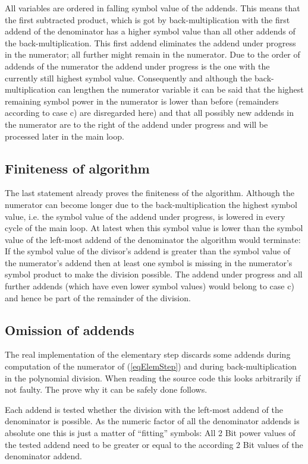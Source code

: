 All variables are ordered in falling symbol value of the addends. This
means that the first subtracted product, which is got by
back-multiplication with the first addend of the denominator has a higher
symbol value than all other addends of the back-multiplication. This first
addend eliminates the addend under progress in the numerator; all further
might remain in the numerator. Due to the order of addends of the
numerator the addend under progress is the one with the currently still
highest symbol value. Consequently and although the back-multiplication
can lengthen the numerator variable it can be said that the highest
remaining symbol power in the numerator is lower than before (remainders
according to case c) are disregarded here) and that all possibly new
addends in the numerator are to the right of the addend under progress and
will be processed later in the main loop.


\subsection{Finiteness of algorithm}

The last statement already proves the finiteness of the algorithm.
Although the numerator can become longer due to the back-multiplication
the highest symbol value, i.e. the symbol value of the addend under
progress, is lowered in every cycle of the main loop. At latest when this
symbol value is lower than the symbol value of the left-most addend of the
denominator the algorithm would terminate: If the symbol value of the
divisor's addend is greater than the symbol value of the numerator's
addend then at least one symbol is missing in the numerator's symbol
product to make the division possible. The addend under progress and all
further addends (which have even lower symbol values) would belong to case
c) and hence be part of the remainder of the division.


\subsection{Omission of addends}

The real implementation of the elementary step discards some addends during
computation of the numerator of (\ref{eqElemStep}) and during
back-multiplication in the polynomial division. When reading the source
code this looks arbitrarily if not faulty. The prove why it can be
safely done follows.

Each addend is tested whether the division with the left-most addend of the
denominator is possible. As the numeric factor of all the denominator
addends is absolute one this is just a matter of ``fitting'' symbols: All 2
Bit power values of the tested addend need to be greater or equal to the
according 2 Bit values of the denominator addend.

